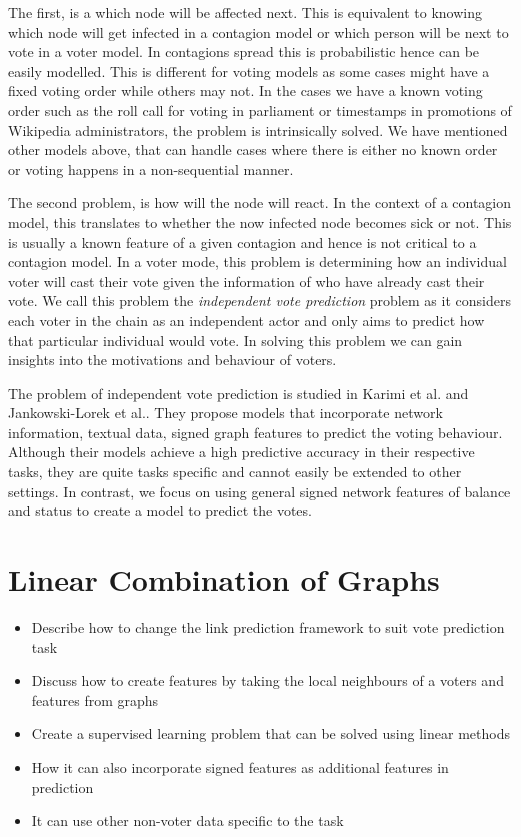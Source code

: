 The first, is a which node will be affected next. This is equivalent to knowing which node will get infected in a contagion model or which person will be next to vote in a voter model. In contagions spread this is probabilistic hence can be easily modelled. This is different for voting models as some cases might have a fixed voting order while others may not. In the cases we have a known voting order such as the roll call for voting in parliament or timestamps in promotions of Wikipedia administrators, the problem is intrinsically solved. We have mentioned other models above, that can handle cases where there is either no known order or voting happens in a non-sequential manner. 

The second problem, is how will the node will react. In the context of a contagion model, this translates to whether the now infected node becomes sick or not. This is usually a known feature of a given contagion and hence is not critical to a contagion model. In a voter mode, this problem is determining how an individual voter will cast their vote given the information of who have already cast their vote. We call this problem the \textit{independent vote prediction} problem as it considers each voter in the chain as an independent actor and only aims to predict how that particular individual would vote. In solving this problem we can gain insights into the motivations and behaviour of voters. 

The problem of independent vote prediction is studied in Karimi et al. \cite{karimi2019multicongress} and Jankowski-Lorek et al.\cite{jankowski-lorek2013MBSN}. They propose models that incorporate network information, textual data, signed graph features to predict the voting behaviour. Although their models achieve a high predictive accuracy in their respective tasks, they are quite tasks specific and cannot easily be extended to other settings. In contrast, we focus on using general signed network features of balance and status to create a model to predict the votes. 

\fi

\section{Linear Combination of Graphs}
\label{sec:linear-combination-theory}
\begin{itemize}
    \item Describe how to change the link prediction framework to suit vote prediction task
    \item Discuss how to create features by taking the local neighbours of a voters and features from graphs 
    \item Create a supervised learning problem that can be solved using linear methods
    \item How it can also incorporate signed features as additional features in prediction
    \item It can use other non-voter data specific to the task
\end{itemize}


